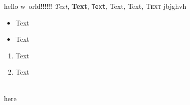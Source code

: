 \documentclass[12pt]{article}
\begin{document}
hello w~orld!!!!!!
\emph{Text}, \textbf{Text}, \texttt{Text}, \textrm{Text},
\textsf{Text}, \textsc{Text}
jbjghvh
\begin{itemize}
\item Text
\item Text
\end{itemize}

\begin{enumerate}
\item Text
\item Text
\end{enumerate}

\\
\newpage
here
\end{document}
